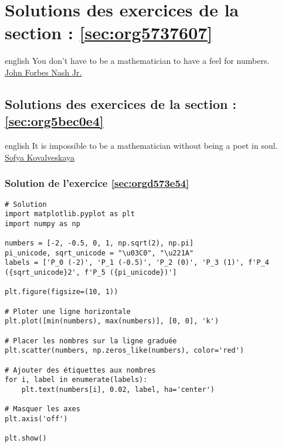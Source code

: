 \documentclass[a4paper, 11pt, twoside]{article}
\begin{document}
\section{Solutions des exercices de la section : \ref{sec:org5737607}}
\label{sec:orge5048fc}

\begin{foreigndisplayquote}{english}
You don’t have to be a mathematician to have a feel for numbers.\\

\href{https://en.wikipedia.org/wiki/John\_Forbes\_Nash\_Jr.}{John Forbes Nash Jr.}
\end{foreigndisplayquote}

\startcontents[level-1]

\subsection{Solutions des exercices de la section : \ref{sec:org5bec0e4}}
\label{sec:org6723b23}

\begin{foreigndisplayquote}{english}
It is impossible to be a mathematician without being a poet in soul.\\

\href{https://en.wikipedia.org/wiki/Sofya\_Kovalevskaya}{Sofya Kovalveskaya}
\end{foreigndisplayquote}

\startcontents[level-2]

\subsubsection{Solution de l'exercice \ref{sec:orgd573e54}}
\label{sec:org5999ed2}
\begin{verbatim}
# Solution
import matplotlib.pyplot as plt
import numpy as np

numbers = [-2, -0.5, 0, 1, np.sqrt(2), np.pi]
pi_unicode, sqrt_unicode = "\u03C0", "\u221A"
labels = ['P_0 (-2)', 'P_1 (-0.5)', 'P_2 (0)', 'P_3 (1)', f'P_4 ({sqrt_unicode}2', f'P_5 ({pi_unicode})']

plt.figure(figsize=(10, 1))

# Ploter une ligne horizontale
plt.plot([min(numbers), max(numbers)], [0, 0], 'k')

# Placer les nombres sur la ligne graduée
plt.scatter(numbers, np.zeros_like(numbers), color='red')

# Ajouter des étiquettes aux nombres
for i, label in enumerate(labels):
    plt.text(numbers[i], 0.02, label, ha='center')

# Masquer les axes
plt.axis('off')

plt.show()
\end{verbatim}
\stopcontents[level-2]
\end{document}
